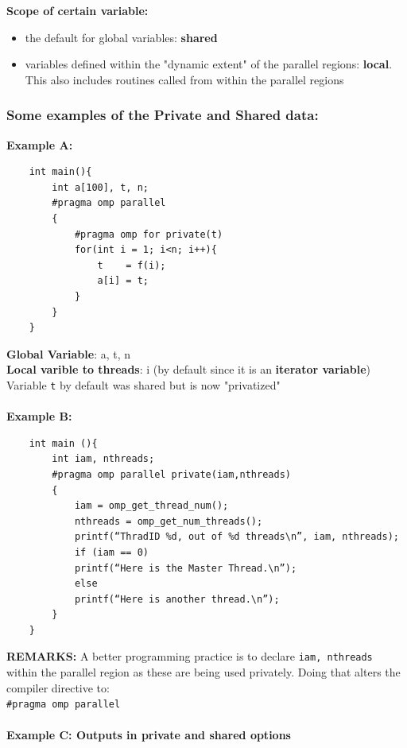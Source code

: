 \documentclass[12pt, a4paper]{report}
\begin{document}
{\bfseries{Scope of certain variable:}}
\begin{itemize}
    \item the default for global variables: {\bfseries{shared}}
    \item variables defined within the "dynamic extent" of the parallel regions: {\bfseries{local}}. This also includes routines called from
          within the parallel regions
\end{itemize}

\subsubsection*{Some examples of the Private and Shared data:}
{\bfseries{Example A:}}
\begin{verbatim}
    int main(){
        int a[100], t, n;
        #pragma omp parallel
        {
            #pragma omp for private(t)
            for(int i = 1; i<n; i++){
                t    = f(i);
                a[i] = t;
            }
        }
    }
\end{verbatim}
{\bfseries{Global Variable}}: a, t, n\\
{\bfseries{Local varible to threads}}: i (by default since it is an {\bfseries{iterator variable}})\\
Variable {\texttt{t}} by default was shared but is now "privatized"\\
\\
{\bfseries{Example B:}}
\begin{verbatim}
    int main (){
        int iam, nthreads;
        #pragma omp parallel private(iam,nthreads)
        {
            iam = omp_get_thread_num();
            nthreads = omp_get_num_threads();
            printf(“ThradID %d, out of %d threads\n”, iam, nthreads);
            if (iam == 0)
            printf(“Here is the Master Thread.\n”);
            else
            printf(“Here is another thread.\n”);
        }
    }
\end{verbatim}
{\bfseries{REMARKS:}} A better programming practice is to declare {\texttt{iam, nthreads}} within the parallel region as these are being used
privately. Doing that alters the compiler directive to:\\ \verb$#pragma omp parallel$\\
\\
{\bfseries{Example C: Outputs in private and shared options}}
\end{document}
